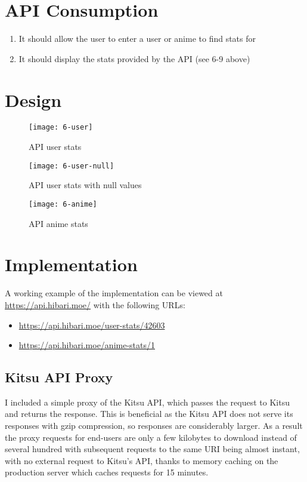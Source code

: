 \section{API Consumption}

\begin{enumerate}
  \item It should allow the user to enter a user or anime to find stats for
  \item It should display the stats provided by the API (see 6-9 above)
\end{enumerate}

\section{Design}

\begin{figure}[H]
  \caption{API user stats}
  \centering
  \texttt{[image: 6-user]}
\end{figure}

\begin{figure}[H]
  \caption{API user stats with null values}
  \centering
  \texttt{[image: 6-user-null]}
\end{figure}

\begin{figure}[H]
  \caption{API anime stats}
  \centering
  \texttt{[image: 6-anime]}
\end{figure}

\section{Implementation}

A working example of the implementation can be viewed at \url{https://api.hibari.moe/} with the following URLs:

\begin{itemize}
  \item \url{https://api.hibari.moe/user-stats/42603}
  \item \url{https://api.hibari.moe/anime-stats/1}
\end{itemize}

\subsection{Kitsu API Proxy}

I included a simple proxy of the Kitsu API, which passes the request to Kitsu and returns the response. This is beneficial as the Kitsu API does not serve its responses with gzip compression, so responses are considerably larger. As a result the proxy requests for end-users are only a few kilobytes to download instead of several hundred with subsequent requests to the same URI being almost instant, with no external request to Kitsu's API, thanks to memory caching on the production server which caches requests for 15 minutes.

